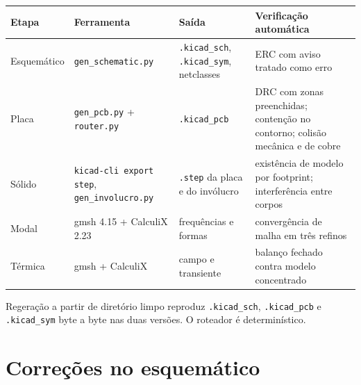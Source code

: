 \documentclass[10pt,a4paper,landscape]{article}
\begin{document}
\begin{table}[H]\footnotesize
\begin{tabularx}{\textwidth}{@{}Y{0.7} Y{1.0} Y{1.3} Y{1.0}@{}}
\toprule
\textbf{Etapa} & \textbf{Ferramenta} & \textbf{Saída} & \textbf{Verificação automática} \\
\midrule
Esquemático & \texttt{gen\_schematic.py} & \texttt{.kicad\_sch}, \texttt{.kicad\_sym}, netclasses & ERC com aviso tratado como erro \\
Placa & \texttt{gen\_pcb.py} + \texttt{router.py} & \texttt{.kicad\_pcb} & DRC com zonas preenchidas; contenção no contorno; colisão mecânica e de cobre \\
Sólido & \texttt{kicad-cli export step}, \texttt{gen\_involucro.py} & \texttt{.step} da placa e do invólucro & existência de modelo por footprint; interferência entre corpos \\
Modal & gmsh 4.15 + CalculiX 2.23 & frequências e formas & convergência de malha em três refinos \\
Térmica & gmsh + CalculiX & campo e transiente & balanço fechado contra modelo concentrado \\
\bottomrule
\end{tabularx}
\end{table}

Regeração a partir de diretório limpo reproduz \texttt{.kicad\_sch}, \texttt{.kicad\_pcb} e \texttt{.kicad\_sym} byte a byte nas duas versões. O roteador é determinístico.

\section{Correções no esquemático}
\end{document}

